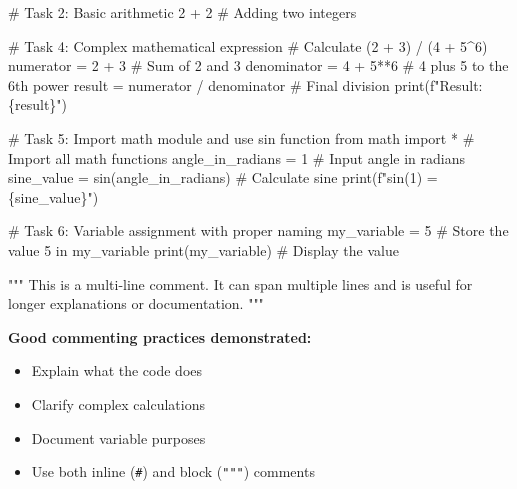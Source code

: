 \documentclass[
  11pt,
]{article}
\newenvironment{Shaded}{\begin{snugshade}}{\end{snugshade}}
\newcommand{\BuiltInTok}[1]{\textcolor[rgb]{0.00,0.23,0.31}{#1}}
\newcommand{\CommentTok}[1]{\textcolor[rgb]{0.37,0.37,0.37}{#1}}
\newcommand{\DecValTok}[1]{\textcolor[rgb]{0.68,0.00,0.00}{#1}}
\newcommand{\ImportTok}[1]{\textcolor[rgb]{0.00,0.46,0.62}{#1}}
\newcommand{\NormalTok}[1]{\textcolor[rgb]{0.00,0.23,0.31}{#1}}
\newcommand{\OperatorTok}[1]{\textcolor[rgb]{0.37,0.37,0.37}{#1}}
\newcommand{\SpecialCharTok}[1]{\textcolor[rgb]{0.37,0.37,0.37}{#1}}
\newcommand{\SpecialStringTok}[1]{\textcolor[rgb]{0.13,0.47,0.30}{#1}}
\begin{document}
\begin{Shaded}
\begin{Highlighting}[]
\CommentTok{\# Task 2: Basic arithmetic}
\DecValTok{2} \OperatorTok{+} \DecValTok{2}  \CommentTok{\# Adding two integers}

\CommentTok{\# Task 4: Complex mathematical expression}
\CommentTok{\# Calculate (2 + 3) / (4 + 5\^{}6)}
\NormalTok{numerator }\OperatorTok{=} \DecValTok{2} \OperatorTok{+} \DecValTok{3}  \CommentTok{\# Sum of 2 and 3}
\NormalTok{denominator }\OperatorTok{=} \DecValTok{4} \OperatorTok{+} \DecValTok{5}\OperatorTok{**}\DecValTok{6}  \CommentTok{\# 4 plus 5 to the 6th power}
\NormalTok{result }\OperatorTok{=}\NormalTok{ numerator }\OperatorTok{/}\NormalTok{ denominator  }\CommentTok{\# Final division}
\BuiltInTok{print}\NormalTok{(}\SpecialStringTok{f"Result: }\SpecialCharTok{\{}\NormalTok{result}\SpecialCharTok{\}}\SpecialStringTok{"}\NormalTok{)}

\CommentTok{\# Task 5: Import math module and use sin function}
\ImportTok{from}\NormalTok{ math }\ImportTok{import} \OperatorTok{*}  \CommentTok{\# Import all math functions}
\NormalTok{angle\_in\_radians }\OperatorTok{=} \DecValTok{1}  \CommentTok{\# Input angle in radians}
\NormalTok{sine\_value }\OperatorTok{=}\NormalTok{ sin(angle\_in\_radians)  }\CommentTok{\# Calculate sine}
\BuiltInTok{print}\NormalTok{(}\SpecialStringTok{f"sin(1) = }\SpecialCharTok{\{}\NormalTok{sine\_value}\SpecialCharTok{\}}\SpecialStringTok{"}\NormalTok{)}

\CommentTok{\# Task 6: Variable assignment with proper naming}
\NormalTok{my\_variable }\OperatorTok{=} \DecValTok{5}  \CommentTok{\# Store the value 5 in my\_variable}
\BuiltInTok{print}\NormalTok{(my\_variable)  }\CommentTok{\# Display the value}

\CommentTok{"""}
\CommentTok{This is a multi{-}line comment.}
\CommentTok{It can span multiple lines and is useful}
\CommentTok{for longer explanations or documentation.}
\CommentTok{"""}
\end{Highlighting}
\end{Shaded}

\textbf{Good commenting practices demonstrated:}

\begin{itemize}
\item
  Explain what the code does
\item
  Clarify complex calculations
\item
  Document variable purposes
\item
  Use both inline (\texttt{\#}) and block (\texttt{"""}) comments
\end{itemize}
\end{document}
